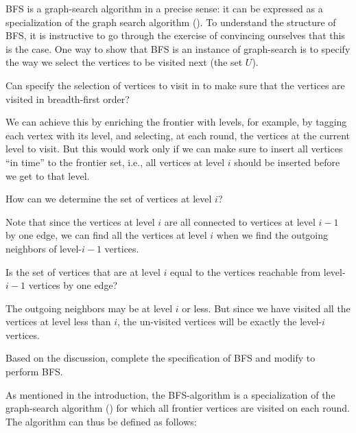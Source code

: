 \begin{notesonly}
BFS is a graph-search algorithm in a precise sense: it can be
expressed as a specialization of the graph search algorithm
().
%
To understand the structure of BFS, it is instructive to go through
the exercise of convincing ourselves that this is the case.
%
One way to show that BFS is an instance of graph-search is to specify
the way we select the vertices to be visited next (the set $U$).
%
\begin{question}
Can specify the selection of vertices to visit in
 to make sure that the vertices are
visited in breadth-first order?
\end{question}
%

We can achieve this by enriching the frontier with levels, for
example, by tagging each vertex with its level, and selecting, at each
round, the vertices at the current level to visit.  But this would
work only if we can make sure to insert all vertices ``in time'' to
the frontier set, i.e., all vertices at level $i$ should be inserted
before we get to that level.
%
\begin{question}
How can we determine the set of vertices at level $i$?
\end{question}
%
Note that since the vertices at level $i$ are all connected to
vertices at level $i-1$ by one edge, we can find all the vertices at
level $i$ when we find the outgoing neighbors of level-$i-1$ vertices.
%
\begin{question}
Is the set of vertices that are at level $i$ equal to the vertices
reachable from level-$i-1$ vertices by one edge?
\end{question}
%

The outgoing neighbors may be at level $i$ or less. But since we have
visited all the vertices at level less than $i$, the un-visited
vertices will be exactly the level-$i$ vertices.

\begin{exercise}
Based on the discussion, complete the specification of BFS and modify  
 to perform BFS.
\end{exercise}

\end{notesonly}

As mentioned in the introduction, the BFS-algorithm is a specialization of the
graph-search algorithm () for which
all frontier vertices are visited on each round.  
The algorithm can thus be defined as follows:

